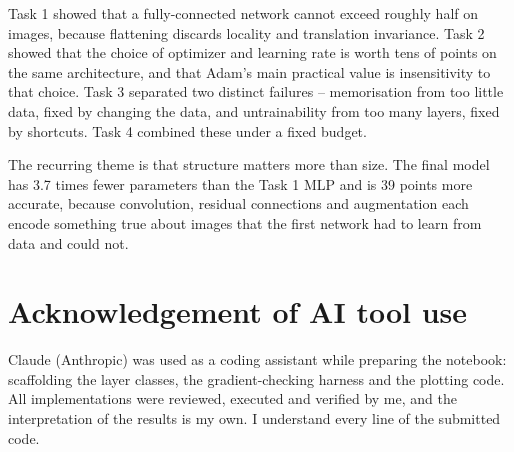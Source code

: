 \documentclass[11pt,a4paper]{article}
\begin{document}
Task 1 showed that a fully-connected network cannot exceed roughly half on
images, because flattening discards locality and translation invariance. Task 2
showed that the choice of optimizer and learning rate is worth tens of points on
the same architecture, and that Adam's main practical value is insensitivity to
that choice. Task 3 separated two distinct failures -- memorisation from too
little data, fixed by changing the data, and untrainability from too many
layers, fixed by shortcuts. Task 4 combined these under a fixed budget.

The recurring theme is that structure matters more than size. The final model
has 3.7 times fewer parameters than the Task 1 MLP and is 39 points more
accurate, because convolution, residual connections and augmentation each encode
something true about images that the first network had to learn from data and
could not.

\section*{Acknowledgement of AI tool use}

Claude (Anthropic) was used as a coding assistant while preparing the notebook:
scaffolding the layer classes, the gradient-checking harness and the plotting
code. All implementations were reviewed, executed and verified by me, and the
interpretation of the results is my own. I understand every line of the
submitted code.
\end{document}
